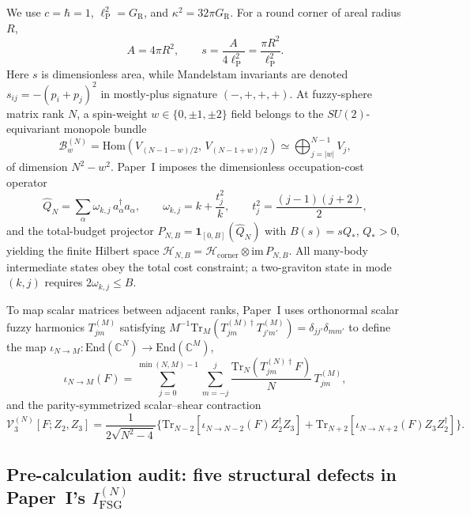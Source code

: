 \documentclass[11pt]{article}
\newcommand{\lP}{\ell_{\mathrm{P}}}
\newcommand{\Tr}{\mathrm{Tr}}
\newcommand{\calB}{\mathcal{B}}
\newcommand{\calH}{\mathcal{H}}
\newcommand{\calV}{\mathcal{V}}
\begin{document}
We use $c=\hbar=1$, $\lP^2 = G_{\mathrm{R}}$, and $\kappa^2 = 32\pi G_{\mathrm{R}}$. For a round corner of areal radius $R$,
\begin{equation}\label{eq:area}
A = 4\pi R^2, \qquad s = \frac{A}{4\lP^2} = \frac{\pi R^2}{\lP^2}.
\end{equation}
Here $s$ is dimensionless area, while Mandelstam invariants are denoted $s_{ij} = -(p_i + p_j)^2$ in mostly-plus signature $(-,+,+,+)$. At fuzzy-sphere matrix rank $N$, a spin-weight $w \in \{0,\pm 1,\pm 2\}$ field belongs to the $SU(2)$-equivariant monopole bundle
\begin{equation}\label{eq:bundle}
\calB_w^{(N)} = \mathrm{Hom}\!\left(V_{(N-1-w)/2},\, V_{(N-1+w)/2}\right) \simeq \bigoplus_{j=|w|}^{N-1} V_j,
\end{equation}
of dimension $N^2 - w^2$. Paper~I imposes the dimensionless occupation-cost operator
\begin{equation}\label{eq:cost}
\widehat{Q}_N = \sum_{\alpha} \omega_{k,j}\,a_\alpha^\dagger a_\alpha, \qquad
\omega_{k,j} = k + \frac{t_j^2}{k}, \qquad t_j^2 = \frac{(j-1)(j+2)}{2},
\end{equation}
and the total-budget projector $P_{N,B} = \mathbf{1}_{[0,B]}(\widehat{Q}_N)$ with $B(s) = s Q_*$, $Q_* > 0$, yielding the finite Hilbert space $\calH_{N,B} = \calH_{\mathrm{corner}} \otimes \mathrm{im}\,P_{N,B}$. All many-body intermediate states obey the total cost constraint; a two-graviton state in mode $(k,j)$ requires $2\omega_{k,j} \le B$.

To map scalar matrices between adjacent ranks, Paper~I uses orthonormal scalar fuzzy harmonics $T_{jm}^{(M)}$ satisfying $M^{-1}\Tr_M(T_{jm}^{(M)\dagger} T_{j'm'}^{(M)}) = \delta_{jj'}\delta_{mm'}$ to define the map $\iota_{N\to M} : \mathrm{End}(\mathbb{C}^N)\to\mathrm{End}(\mathbb{C}^M)$,
\begin{equation}\label{eq:iota}
\iota_{N\to M}(F) = \sum_{j=0}^{\min(N,M)-1}\sum_{m=-j}^{j} \frac{\Tr_N(T_{jm}^{(N)\dagger} F)}{N}\,T_{jm}^{(M)},
\end{equation}
and the parity-symmetrized scalar--shear contraction
\begin{equation}\label{eq:cubic_vertex}
\calV_3^{(N)}[F; Z_2, Z_3] = \frac{1}{2\sqrt{N^2 - 4}}\Big\{\Tr_{N-2}[\iota_{N\to N-2}(F) Z_2^\dagger Z_3] + \Tr_{N+2}[\iota_{N\to N+2}(F) Z_3 Z_2^\dagger]\Big\}.
\end{equation}

\subsection{Pre-calculation audit: five structural defects in Paper~I's \texorpdfstring{$I_{\mathrm{FSG}}^{(N)}$}{I\_FSG}}\label{sec:five_defects}
\end{document}
